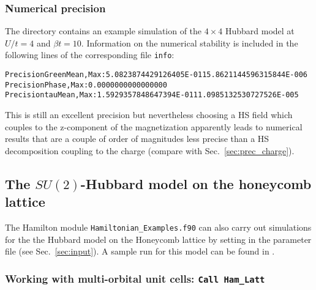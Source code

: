 \subsubsection{Numerical precision}\label{sec:prec_spin}
The directory   contains an example simulation of the $4 \times 4$ Hubbard model at $U/t=4$ and $\beta t = 10$. 
Information on the numerical stability is included in the following lines of the corresponding file \texttt{info}:
 \begin{alltt}
Precision Green  Mean, Max :    5.0823874429126405E-011   5.8621144596315844E-006
Precision Phase, Max       :    0.0000000000000000     
Precision tau    Mean, Max :    1.5929357848647394E-011   1.0985132530727526E-005 
\end{alltt}

This is still an excellent precision but nevertheless choosing a 
 HS field which couples to the z-component of the magnetization apparently leads to numerical results that are 
a couple of order of magnitudes less precise than a HS decomposition coupling to the charge (compare with Sec.~\ref{sec:prec_charge}).

    

\subsection{The $SU(2)$-Hubbard model on  the honeycomb  lattice}\label{sec:walk1.2}

The Hamilton module \texttt{Hamiltonian\_Examples.f90}   can also carry out simulations for  the the Hubbard model on the Honeycomb lattice by setting in the parameter file    (see Sec.~\ref{sec:input}).
 A sample run for this model can be found in .

\subsubsection{Working with multi-orbital unit cells:  \texttt{Call Ham\_Latt} } \label{sec:multi-orbital}

